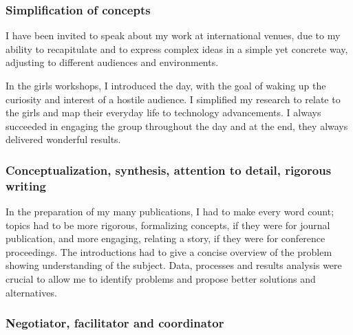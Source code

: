 \begin{minipage}{0.48\textwidth}

\subsubsection*{Simplification of concepts}
\vspace*{-0.2cm}


I have been invited to speak about my work at international venues,
due to my ability to recapitulate and to express complex ideas in a simple
yet concrete way, adjusting 
to different audiences and environments.

\vspace*{.1cm}

In the girls workshops, I introduced the day, with the goal of waking up
the curiosity and interest of a hostile audience.  I simplified my research
to relate to the girls and map their everyday life to technology
advancements. I always succeeded in engaging the group throughout the day
and at the end, they always delivered wonderful results.


\subsubsection*{Conceptualization, synthesis, attention to detail,
rigorous writing}
\vspace*{-0.2cm}


In the preparation of my many publications, I had to make every
word count; topics had to be more rigorous, formalizing concepts, if they
were for journal publication, and more engaging, relating a story, if they
were for conference proceedings. The introductions had to give a concise
overview of the problem showing understanding of the subject.
Data, processes and results analysis were
crucial to allow me to identify problems and propose better solutions and
alternatives.


\subsubsection*{Negotiator, facilitator and coordinator}
\vspace*{-0.2cm}


\end{minipage}
